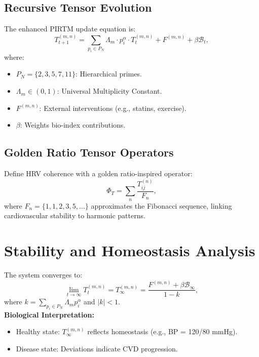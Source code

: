 \documentclass{article}
\theoremstyle{plain}
\theoremstyle{claimstyle}
\begin{document}
\subsection{Recursive Tensor Evolution}
The enhanced PIRTM update equation is:
\begin{equation}
T_{t+1}^{(m, n)} = \sum_{p_i \in P_N} \Lambda_m \cdot p_i^{\alpha} \cdot T_t^{(m, n)} + F^{(m, n)} + \beta \mathcal{B}_t,
\end{equation}
where:
\begin{itemize}
    \item \( P_N = \{2, 3, 5, 7, 11\} \): Hierarchical primes.
    \item \( \Lambda_m \in (0, 1) \): Universal Multiplicity Constant.
    \item \( F^{(m, n)} \): External interventions (e.g., statins, exercise).
    \item \( \beta \): Weights bio-index contributions.
\end{itemize}

\subsection{Golden Ratio Tensor Operators}
Define HRV coherence with a golden ratio-inspired operator:
\begin{equation}
\Phi_T = \sum_{n} \frac{T_{ij}^{(n)}}{F_n},
\end{equation}
where \( F_n = \{1, 1, 2, 3, 5, \ldots\} \) approximates the Fibonacci sequence, linking cardiovascular stability to harmonic patterns.

\section{Stability and Homeostasis Analysis}
The system converges to:
\begin{equation}
\lim_{t \to \infty} T_t^{(m, n)} = T_{\infty}^{(m, n)} = \frac{F^{(m, n)} + \beta \mathcal{B}_{\infty}}{1 - k},
\end{equation}
where \( k = \sum_{p_i \in P_N} \Lambda_m p_i^{\alpha} \) and \( |k| < 1 \). \\
\textbf{Biological Interpretation:}
\begin{itemize}
    \item Healthy state: \( T_{\infty}^{(m, n)} \) reflects homeostasis (e.g., BP = 120/80 mmHg).
    \item Disease state: Deviations indicate CVD progression.
\end{itemize}
\end{document}
